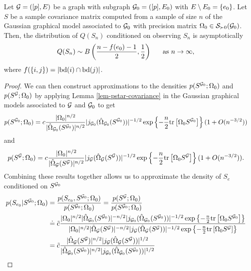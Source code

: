 \begin{theorem} \label{thm-one-edge-less}
    Let ${\mathcal{G}} = ([p], E)$ be a graph with subgraph ${\mathcal{G}}_0 = ([p], E_0)$ with $E \setminus E_0 = {\left\{e_0\right\}}$. Let $S$ be a sample covariance matrix computed from a sample of size $n$ of the Gaussian graphical model associated to ${\mathcal{G}}_0$ with precision matrix $\Omega_0 \in {\mathcal{S}}_{\succ 0}({\mathcal{G}}_0)$. Then, the distribution of $Q(S_n)$ conditioned on observing $S_n$ is asymptotically
    \begin{equation}
        Q(S_n) \sim B\left(\frac{n - f(e_0) - 1}{2}, \frac{1}{2} \right)\ \ \ \ {\textrm{ as }} n \rightarrow \infty,
    \end{equation}
    where $f({\left\{i, j\right\}}) = |{\textrm{bd}}(i) \cap {\textrm{bd}}(j)|$.
\end{theorem}
\begin{proof}
    We can then construct approximations to the densities $p(S^{{\mathcal{G}}_0}; \Omega_0)$ and $p(S^{{\mathcal{G}}}; \Omega_0)$ by applying Lemma \ref{lem-pstar-covariance} in the Gaussian graphical models associated to ${\mathcal{G}}$ and ${\mathcal{G}}_0$ to get
    \begin{equation*}
        p(S^{{\mathcal{G}}_0}; \Omega_0) = c \frac{|\Omega_0|^{n/2}}{|\hat\Omega_{{\mathcal{G}}_0}(S^{{\mathcal{G}}_0})|^{n/2}} |j_{{\mathcal{G}}_0}(\hat\Omega_{{\mathcal{G}}_0}(S^{{\mathcal{G}}_0})) |^{-1/2} \exp\left\{-\frac{n}{2} {\textrm{tr}\left[\Omega_0 S^{{\mathcal{G}}_0}\right]}\right\} (1 + O(n^{-3/2}))
    \end{equation*}
    and
    \begin{equation*}
        p(S^{\mathcal{G}}; \Omega_0) = c \frac{|\Omega_0|^{n/2}}{|\hat\Omega_{\mathcal{G}}(S^{\mathcal{G}})|^{n/2}} |j_{\mathcal{G}}(\hat\Omega_{\mathcal{G}}(S^{\mathcal{G}})) |^{-1/2} \exp\left\{-\frac{n}{2} {\textrm{tr}\left[\Omega_0 S^{\mathcal{G}}\right]}\right\} (1 + O(n^{-3/2})).
    \end{equation*}
    Combining these results together allows us to approximate the density of $S_e$ conditioned on $S^{{\mathcal{G}}_0}$
    \begin{align*}
        p(S_{e_0}| S^{\G_0}; \Omega_0)
        &= \frac{p(S_{e_0}, S^{\G_0}; \Omega_0)}{p(S^{\G_0}; \Omega_0)} = \frac{p(S^{\G}; \Omega_0)}{p(S^{\G_0}; \Omega_0)}\\
        & \doteq \tilde c 
        \frac
            {|\Omega_0|^{n/2}|\hat\Omega_{\G_0}(S^{\G_0})|^{-n/2} |j_{\G_0}(\hat\Omega_{\G_0}(S^{\G_0})) |^{-1/2} \expfc{-\frac{n}{2} \trB{\Omega_0 S^{\G_0}}}}
            {|\Omega_0|^{n/2}|\hat\Omega_\G(S^\G)|^{-n/2} |j_\G(\hat\Omega_\G(S^\G)) |^{-1/2} \expfc{-\frac{n}{2} \trB{\Omega_0 S^\G}}}\\
        &= \tilde c 
        \frac
            {|\hat\Omega_\G(S^\G)|^{n/2} |j_\G(\hat\Omega_\G(S^\G)) |^{1/2}}    
            {|\hat\Omega_{\G_0}(S^{\G_0})|^{n/2} |j_{\G_0}(\hat\Omega_{\G_0}(S^{\G_0})) |^{1/2}}\\

\end{align*}
\end{proof}
